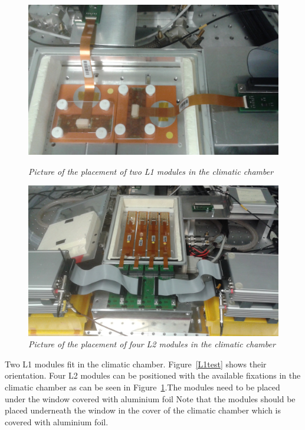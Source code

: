 \documentclass[a4paper,12pt,twoside]{article}
\begin{document}
\begin{figure} [h!]
\centering
\begin{minipage}{.49\textwidth}
  \centering
  \includegraphics[width=\textwidth]{./L1test.jpg}
  \caption{\em Picture of the placement of two L1 modules in the climatic chamber}
  \label{L1test}
\end{minipage}%
\hspace{1mm}
\begin{minipage}{.49\textwidth}
  \centering
  \includegraphics[width=\textwidth]{./L2test.jpg}
  \caption{\em Picture of the placement of four L2 modules in the climatic chamber}
  \label{L2test}
\end{minipage}
\end{figure}

Two L1 modules fit in the climatic chamber. Figure~\ref{L1test} shows their orientation.
Four L2 modules can be positioned with the available fixations in the climatic chamber as can be seen in Figure~\ref{L2test}.The modules need to be placed under the window covered with aluminium foil
Note that the modules should be placed underneath the window in the cover of the climatic chamber which is covered with aluminium foil. 
\end{document}

